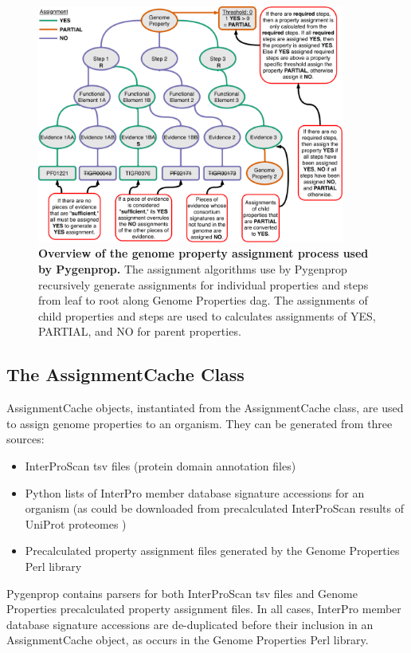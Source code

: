 \begin{figure}[!ht]
  \centering
	\includegraphics[width=0.90\textwidth]{media/Pygenprop_Assignment.pdf}
	 \caption[Overview of the genome property assignment process used by 
Pygenprop.]{\textbf{Overview of the genome property assignment process used by 
Pygenprop.} The assignment algorithms use by Pygenprop recursively generate 
assignments for individual properties and steps from leaf to root along Genome 
Properties \gls{dag}. The assignments of child properties and steps are used to 
calculates assignments of YES, PARTIAL, and NO for parent properties.}
	 \label{fig:propertyassignment}
\end{figure}

\subsection{The AssignmentCache Class} \label{AssignmentCache}

AssignmentCache objects, instantiated from the AssignmentCache class, are used 
to assign genome properties to an organism. They can be generated from three 
sources: 
\begin{itemize}
\item InterProScan \gls{tsv} files (protein domain annotation files) 
\item Python lists of InterPro member database signature accessions for an 
organism (as could be downloaded from precalculated InterProScan results of 
UniProt proteomes \cite{uniprot2014uniprot})
\item Precalculated property assignment files generated by the Genome Properties 
Perl library
\end{itemize}
Pygenprop contains parsers for both InterProScan \gls{tsv} files and Genome 
Properties precalculated property assignment files. In all cases, InterPro 
member database signature accessions are de-duplicated before their inclusion in 
an AssignmentCache object, as occurs in the Genome Properties Perl library.

